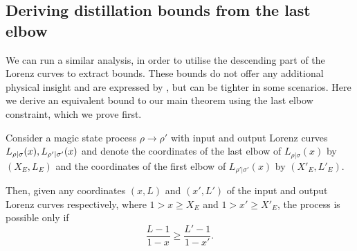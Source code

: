 \documentclass[pra,
aps,
twocolumn,
superscriptaddress,
groupedaddress,
nofootinbib,
reprint
]{revtex4-1}
\begin{document}
\subsection{Deriving distillation bounds from the last elbow}
\label{sec:last_elb}

We can run a similar analysis, in order to utilise the descending part of the Lorenz curves to extract bounds.
These bounds do not offer any additional physical insight and are expressed by , but can be tighter in some scenarios.
Here we derive an equivalent bound to our main theorem using the last elbow constraint, which we prove first.

\begin{proposition}\label{prop:last_elb}
	Consider a magic state process $\rho \longrightarrow \rho'$ with input and output Lorenz curves ${L_{\rho|\sigma}}(x), {L_{\rho'|\sigma'}}(x)$ and denote the coordinates of the last elbow of $L_{\rho|\sigma}(x)$ by $(X_E, L_E)$ and the coordinates of the first elbow of $L_{\rho' |\sigma'}(x)$ by $(X'_E, L'_E)$.
	
Then, given any coordinates $(x, L)$ and $(x', L')$ of the input and output Lorenz curves respectively, where $1 > x \geq X_E$ and $1 > x' \geq X'_E$, the process is possible only if
\begin{equation}\label{eq:last_elb_bound1}
	\frac{L - 1}{1-x} \geq \frac{L' - 1}{1-x'}.
\end{equation}
\end{proposition}
\end{document}
